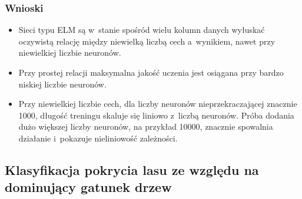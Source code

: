 \documentclass{article}
\begin{document}
\subsubsection{Wnioski}
\begin{itemize}
\item Sieci typu ELM są w~stanie spośród wielu kolumn danych wyłuskać oczywistą relację między niewielką liczbą cech a~wynikiem, nawet przy niewielkiej liczbie neuronów.
\item Przy prostej relacji maksymalna jakość uczenia jest osiągana przy bardzo niskiej liczbie neuronów.
\item Przy niewielkiej liczbie cech, dla liczby neuronów nieprzekraczającej znacznie 1000, długość treningu skaluje się liniowo z~liczbą neuronów. Próba dodania dużo większej liczby neuronów, na przykład 10000, znacznie spowalnia działanie i~pokazuje nieliniowość zależności.
\end{itemize}
\subsection{Klasyfikacja pokrycia lasu ze względu na dominujący gatunek drzew}
\end{document}

